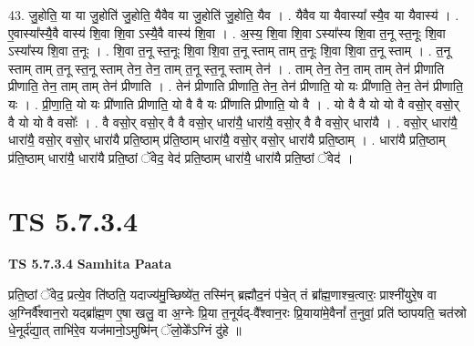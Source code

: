 \documentclass[17pt]{extarticle}
\begin{document}
43. जु॒होति॒ या या जु॒होति॑ जु॒होति॒ यैवैव या जु॒होति॑ जु॒होति॒ यैव । . यैवैव या यैवास्या᳚ स्यै॒व या यैवास्य॑ । . ए॒वास्या᳚स्यै॒वै वास्य॑ शि॒वा शि॒वा ऽस्यै॒वै वास्य॑ शि॒वा । . अ॒स्य॒ शि॒वा शि॒वा ऽस्या᳚स्य शि॒वा त॒नू स्त॒नूः शि॒वा ऽस्या᳚स्य शि॒वा त॒नूः । . शि॒वा त॒नू स्त॒नूः शि॒वा शि॒वा त॒नू स्ताम् ताम् त॒नूः शि॒वा शि॒वा त॒नू स्ताम् । . त॒नू स्ताम् ताम् त॒नू स्त॒नू स्ताम् तेन॒ तेन॒ ताम् त॒नू स्त॒नू स्ताम् तेन॑ । . ताम् तेन॒ तेन॒ ताम् ताम् तेन॑ प्रीणाति प्रीणाति॒ तेन॒ ताम् ताम् तेन॑ प्रीणाति । . तेन॑ प्रीणाति प्रीणाति॒ तेन॒ तेन॑ प्रीणाति॒ यो यः प्री॑णाति॒ तेन॒ तेन॑ प्रीणाति॒ यः । . प्री॒णा॒ति॒ यो यः प्री॑णाति प्रीणाति॒ यो वै वै यः प्री॑णाति प्रीणाति॒ यो वै । . यो वै वै यो यो वै वसो॒र् वसो॒र् वै यो यो वै वसोः᳚ । . वै वसो॒र् वसो॒र् वै वै वसो॒र् धारा॑यै॒ धारा॑यै॒ वसो॒र् वै वै वसो॒र् धारा॑यै । . वसो॒र् धारा॑यै॒ धारा॑यै॒ वसो॒र् वसो॒र् धारा॑यै प्रति॒ष्ठाम् प्र॑ति॒ष्ठाम् धारा॑यै॒ वसो॒र् वसो॒र् धारा॑यै प्रति॒ष्ठाम् । . धारा॑यै प्रति॒ष्ठाम् प्र॑ति॒ष्ठाम् धारा॑यै॒ धारा॑यै प्रति॒ष्ठां ॅवेद॒ वेद॑ प्रति॒ष्ठाम् धारा॑यै॒ धारा॑यै प्रति॒ष्ठां ॅवेद॑ । \newline
\pagebreak
{}

\section{ TS 5.7.3.4 }

\textbf{TS 5.7.3.4 } \newline
\textbf{Samhita Paata} \newline

प्रति॒ष्ठां ॅवेद॒ प्रत्ये॒व ति॑ष्ठति॒ यदाज्य॑मु॒च्छिष्ये॑त॒ तस्मि॑न् ब्रह्मौद॒नं प॑चे॒त् तं ब्रा᳚ह्म॒णाश्च॒त्वारः॒ प्राश्नी॑युरे॒ष वा अ॒ग्निर्वै᳚श्वान॒रो यद्ब्रा᳚ह्म॒ण ए॒षा खलु॒ वा अ॒ग्नेः प्रि॒या त॒नूर्यद्-वै᳚श्वान॒रः प्रि॒याया॑मे॒वैनां᳚ त॒नुवां॒ प्रति॑ ष्ठापयति॒ चत॑स्रो धे॒नूर्द॑द्या॒त् ताभि॑रे॒व यज॑मानो॒ऽमुष्मि॑न् ॅलो॒के᳚ऽग्निं दु॑हे ॥ \newline
\end{document}
